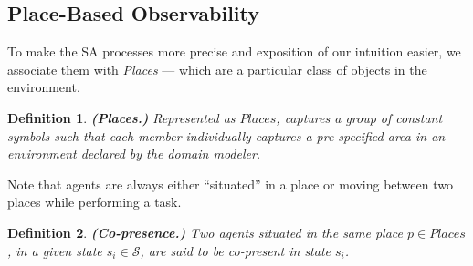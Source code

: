 \documentclass[letterpaper]{article} %
\newtheorem{definition}{Definition}
\begin{document}
\subsection{Place-Based Observability}




To make the SA processes more precise and exposition of our intuition easier, we associate them with  \textit{Places} --- which are a particular class of objects in the environment. 

\begin{definition} \label{def:places}
\textbf{(Places.)} Represented as $\mathit{Places}$, captures a group of constant symbols such that each member individually captures a pre-specified area in an environment declared by the domain modeler.  
\end{definition}


Note that agents are always either ``situated'' in a place or moving between two places while performing a task. 

\begin{definition} \label{def:copresence}
\textbf{(Co-presence.)} Two agents situated in the same place $p \in \mathit{Places}$, in a given state $s_i \in \mathcal{S}$, are said to be \textit{co-present} in state $s_i$.
\end{definition}
\end{document}
